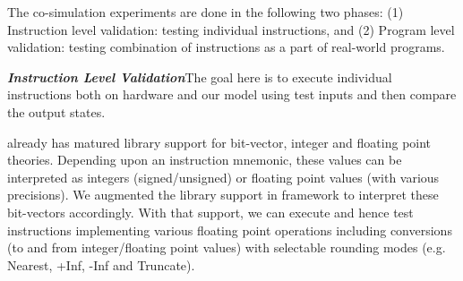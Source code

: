 The co-simulation experiments are done in the following two phases: (1) Instruction level validation: testing individual instructions, and (2) Program level validation: testing combination of instructions  as a part of real-world programs. 

\vspace{2pt}
\noindent\textbf{\emph{Instruction Level Validation}}\;\;The goal here is to execute individual instructions both on hardware and our model using test inputs and then compare the output states. 

\K already has matured library support for bit-vector, integer and floating point theories.  Depending upon an instruction mnemonic, these values can be interpreted as integers (signed/unsigned) or floating point values (with various precisions).  We augmented the library support in \K framework to interpret these bit-vectors accordingly. With that support, we can execute and hence test instructions implementing various floating point operations including conversions (to and from integer/floating point values) with selectable rounding modes (e.g. Nearest, +Inf, -Inf and Truncate).   

